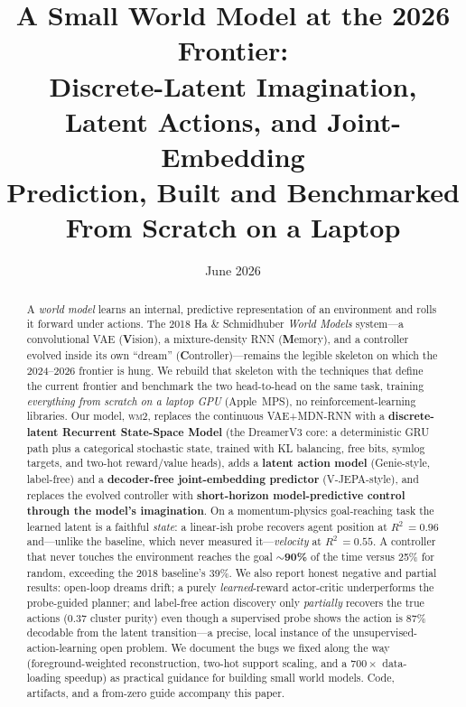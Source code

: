\documentclass[11pt]{article}
\title{\textbf{A Small World Model at the 2026 Frontier:\\
Discrete-Latent Imagination, Latent Actions, and Joint-Embedding\\
Prediction, Built and Benchmarked From Scratch on a Laptop}}
\author{}
\date{June 2026}
\newcommand{\wmtwo}{\textsc{wm2}}
\newcommand{\rtwo}{$R^2$}
\begin{document}
\maketitle

\begin{abstract}
\noindent
A \emph{world model} learns an internal, predictive representation of an
environment and rolls it forward under actions. The 2018 Ha \& Schmidhuber
\emph{World Models} system---a convolutional VAE (\textbf{V}ision), a mixture-density
RNN (\textbf{M}emory), and a controller evolved inside its own ``dream''
(\textbf{C}ontroller)---remains the legible skeleton on which the 2024--2026
frontier is hung. We rebuild that skeleton with the techniques that define the
current frontier and benchmark the two head-to-head on the same task, training
\emph{everything from scratch on a laptop GPU} (Apple~MPS), no reinforcement-learning
libraries. Our model, \wmtwo, replaces the continuous VAE+MDN-RNN with a
\textbf{discrete-latent Recurrent State-Space Model} (the DreamerV3 core: a
deterministic GRU path plus a categorical stochastic state, trained with KL
balancing, free bits, symlog targets, and two-hot reward/value heads), adds a
\textbf{latent action model} (Genie-style, label-free) and a \textbf{decoder-free
joint-embedding predictor} (V-JEPA-style), and replaces the evolved controller with
\textbf{short-horizon model-predictive control through the model's imagination}.
On a momentum-physics goal-reaching task the learned latent is a faithful
\emph{state}: a linear-ish probe recovers agent position at \rtwo\,$=0.96$ and---unlike
the baseline, which never measured it---\emph{velocity} at \rtwo\,$=0.55$. A
controller that never touches the environment reaches the goal \textbf{$\sim$90\%} of
the time versus 25\% for random, exceeding the 2018 baseline's 39\%. We also report
honest negative and partial results: open-loop dreams drift; a purely
\emph{learned}-reward actor-critic underperforms the probe-guided planner; and
label-free action discovery only \emph{partially} recovers the true actions
(0.37 cluster purity) even though a supervised probe shows the action is 87\%
decodable from the latent transition---a precise, local instance of the
unsupervised-action-learning open problem. We document the bugs we fixed along the
way (foreground-weighted reconstruction, two-hot support scaling, and a
$700\times$ data-loading speedup) as practical guidance for building small world
models. Code, artifacts, and a from-zero guide accompany this paper.
\end{abstract}
\end{document}
